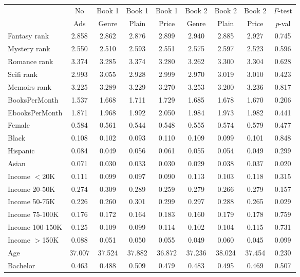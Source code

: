 \begin{center}
\begin{tabular}{lcccccccc}
\hline \noalign{\smallskip} & No & Book 1 & Book 1 & Book 1 & Book 2 & Book 2 & Book 2 & \emph{F}-test\\
 & Ads & Genre & Plain & Price & Genre & Plain & Price & \emph{p}-val\\
\noalign{\smallskip}\hline \noalign{\smallskip}Fantasy rank & 2.858 & 2.862 & 2.876 & 2.899 & 2.940 & 2.885 & 2.927 & 0.745\\
Mystery rank & 2.550 & 2.510 & 2.593 & 2.551 & 2.575 & 2.597 & 2.523 & 0.596\\
Romance rank & 3.374 & 3.285 & 3.374 & 3.280 & 3.262 & 3.300 & 3.304 & 0.628\\
Scifi rank & 2.993 & 3.055 & 2.928 & 2.999 & 2.970 & 3.019 & 3.010 & 0.423\\
Memoirs rank & 3.225 & 3.289 & 3.229 & 3.270 & 3.253 & 3.200 & 3.236 & 0.817\\
BooksPerMonth & 1.537 & 1.668 & 1.711 & 1.729 & 1.685 & 1.678 & 1.670 & 0.206\\
EbooksPerMonth & 1.871 & 1.968 & 1.992 & 2.050 & 1.984 & 1.973 & 1.982 & 0.441\\
Female & 0.584 & 0.561 & 0.544 & 0.548 & 0.555 & 0.574 & 0.579 & 0.477\\
Black & 0.108 & 0.102 & 0.093 & 0.110 & 0.109 & 0.099 & 0.101 & 0.848\\
Hispanic & 0.084 & 0.049 & 0.056 & 0.061 & 0.055 & 0.054 & 0.049 & 0.299\\
Asian & 0.071 & 0.030 & 0.033 & 0.030 & 0.029 & 0.038 & 0.037 & 0.020\\
Income $<$20K & 0.111 & 0.099 & 0.097 & 0.090 & 0.113 & 0.103 & 0.118 & 0.315\\
Income 20-50K & 0.274 & 0.309 & 0.289 & 0.259 & 0.279 & 0.266 & 0.279 & 0.157\\
Income 50-75K & 0.226 & 0.260 & 0.301 & 0.299 & 0.297 & 0.288 & 0.265 & 0.029\\
Income 75-100K & 0.176 & 0.172 & 0.164 & 0.183 & 0.160 & 0.179 & 0.178 & 0.759\\
Income 100-150K & 0.125 & 0.109 & 0.099 & 0.114 & 0.102 & 0.104 & 0.115 & 0.731\\
Income $>$150K & 0.088 & 0.051 & 0.050 & 0.055 & 0.049 & 0.060 & 0.045 & 0.099\\
Age & 37.007 & 37.524 & 37.882 & 36.872 & 37.236 & 38.024 & 37.454 & 0.230\\
Bachelor & 0.463 & 0.488 & 0.509 & 0.479 & 0.483 & 0.495 & 0.469 & 0.507\\

\end{tabular}
\end{center}
